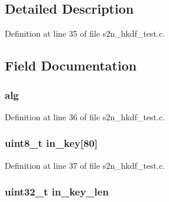\subsection{Detailed Description}


Definition at line 35 of file s2n\+\_\+hkdf\+\_\+test.\+c.



\subsection{Field Documentation}
\subsubsection[{\texorpdfstring{alg}{alg}}]{ alg}\hypertarget{structhkdf__test__vector_ae2daecd156006e6cf5c5800a7293628c}{}\label{structhkdf__test__vector_ae2daecd156006e6cf5c5800a7293628c}


Definition at line 36 of file s2n\+\_\+hkdf\+\_\+test.\+c.

\subsubsection[{\texorpdfstring{in\+\_\+key}{in_key}}]{\setlength{\rightskip}{0pt plus 5cm}uint8\+\_\+t in\+\_\+key\mbox{[}80\mbox{]}}\hypertarget{structhkdf__test__vector_a8d746c85ffd247aeb96e29e45c20f94b}{}\label{structhkdf__test__vector_a8d746c85ffd247aeb96e29e45c20f94b}


Definition at line 37 of file s2n\+\_\+hkdf\+\_\+test.\+c.

\subsubsection[{\texorpdfstring{in\+\_\+key\+\_\+len}{in_key_len}}]{\setlength{\rightskip}{0pt plus 5cm}uint32\+\_\+t in\+\_\+key\+\_\+len}\hypertarget{structhkdf__test__vector_ae4d3be84b6200c352c5df57bba47318e}{}\label{structhkdf__test__vector_ae4d3be84b6200c352c5df57bba47318e}


